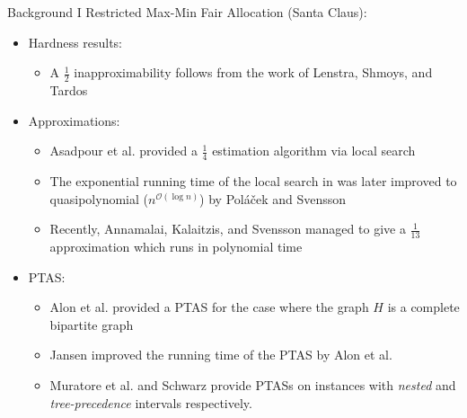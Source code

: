 \documentclass[10pt]{beamer}
\begin{document}
\begin{frame}{Background I}
	Restricted Max-Min Fair Allocation (Santa Claus):
	\begin{itemize}
		\item<2-> Hardness results:
        \begin{itemize}
        	\item<3-> A $\frac{1}{2}$ inapproximability follows from the work of Lenstra, Shmoys, and Tardos \cite{LST90} 
		\end{itemize}
        \item<4-> Approximations:
        \begin{itemize}
            \item<5-> Asadpour et al. provided a $\frac{1}{4}$ \alert{estimation} algorithm via local search \cite{AFS08}
            \item<6-> The exponential running time of the local search in \cite{AFS08} was later improved to quasipolynomial ($n^{\mathcal{O}(\log n)}$) by Pol\'{a}\v{c}ek and Svensson \cite{PS12}
            \item<7-> Recently, Annamalai, Kalaitzis, and Svensson managed to give a \alert{$\frac{1}{13}$} approximation which runs in polynomial time \cite{AKS14}
        \end{itemize}
        \item<8-> PTAS:
        \begin{itemize}
            \item<9-> Alon et al. provided a PTAS for the case where the graph $H$ is a complete bipartite graph \cite{AAWY98}
            \item<10-> Jansen improved the running time of the PTAS by Alon et al. \cite{Jansen10}
            \item<11-> Muratore et al. \cite{MSW10} and Schwarz \cite{Schwarz10} provide PTASs on instances with \emph{nested} and \emph{tree-precedence} intervals respectively.
        \end{itemize}
	\end{itemize}
\end{frame}
\end{document}
